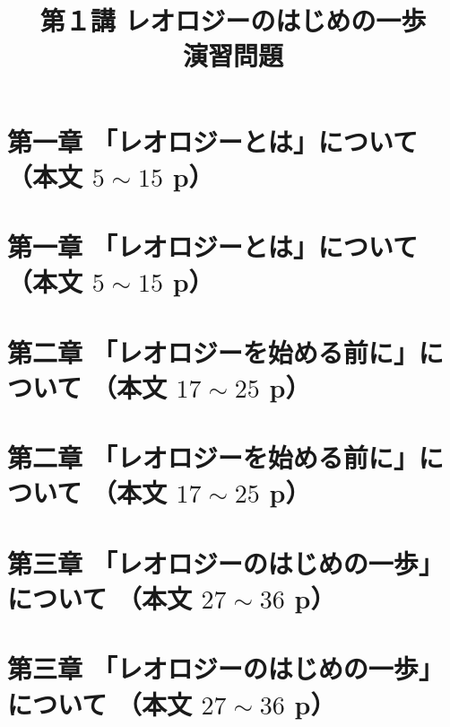 \documentclass[uplatex,dvipdfmx,a4paper,11pt]{jsreport}
\title{第１講 レオロジーのはじめの一歩\\演習問題}
\author{}
\date{}
\begin{document}
\maketitle

\section*{第一章 「レオロジーとは」について （本文 $5\sim15$ p）}

\clearpage
\section*{第一章 「レオロジーとは」について （本文 $5\sim15$ p）}


\clearpage
\section*{第二章 「レオロジーを始める前に」について （本文 $17\sim25$ p）}

\clearpage
\section*{第二章 「レオロジーを始める前に」について （本文 $17\sim25$ p）}


\clearpage
\section*{第三章 「レオロジーのはじめの一歩」について （本文 $27\sim36$ p）}

\clearpage
\section*{第三章 「レオロジーのはじめの一歩」について （本文 $27\sim36$ p）}

\end{document}
